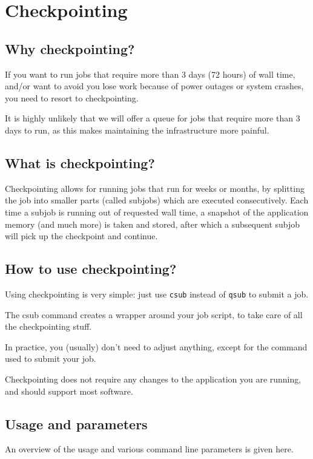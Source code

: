 \chapter{Checkpointing}
\label{ch:checkpointing}

\section{Why checkpointing?}
If you want to run jobs that require more than 3 days (72 hours) of wall time,
and/or want to avoid you lose work because of power outages or system crashes,
you need to resort to checkpointing.

It is highly unlikely that we will offer a queue for jobs that require more
than 3 days to run, as this makes maintaining the infrastructure more painful.


\section{What is checkpointing?}

Checkpointing allows for running jobs that run for weeks or months, by splitting
the job into smaller parts (called subjobs) which are executed consecutively.
Each time a subjob is running out of requested wall time, a snapshot of the
application memory (and much more) is taken and stored, after which a subsequent
subjob will pick up the checkpoint and continue.

\section{How to use checkpointing?}

Using checkpointing is very simple: just use \lstinline|csub| instead of \lstinline|qsub| to submit a job.

The csub command creates a wrapper around your job script, to take care
of all the checkpointing stuff.

In practice, you (usually) don't need to adjust anything, except for the command used to submit your job.

Checkpointing does not require any changes to the application you are running, and should support most software.

\section{Usage and parameters}

An overview of the usage and various command line parameters is given here.


